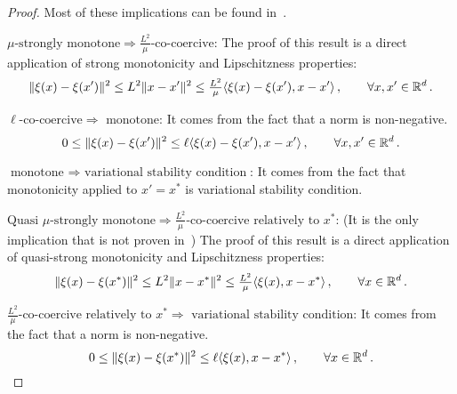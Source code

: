 \documentclass{article}
\begin{document}
\begin{proof}
Most of these implications can be found in~\citet{facchinei2007finite}.

$\mu\text{-strongly monotone}  \Longrightarrow  \frac{L^2}{\mu}\text{-co-coercive}$: 
The proof of this result is a direct application of strong monotonicity and Lipschitzness properties:
\begin{equation*}
  \|\xi(x)-\xi(x')\|^2 \leq L^2 \|x-x'\|^2 \leq \tfrac{L^2}{\mu} \langle \xi(x)-\xi(x'), x-x' \rangle \, , \qquad \forall x,x' \in \mathbb{R}^d\,.
\end{equation*}

$\ell\text{-co-coercive} \Longrightarrow \text{ monotone}$: It comes from the fact that a norm is non-negative. 
\begin{equation*}
  0 \leq \|\xi(x)-\xi(x')\|^2  \leq \ell \langle \xi(x)-\xi(x'), x-x' \rangle \, , \qquad \forall x,x' \in \mathbb{R}^d\,.
\end{equation*}

$\text{monotone } \Longrightarrow \text{ variational stability condition}$: It comes from the fact that monotonicity applied to $x' = x^*$ is variational stability condition.

$\text{Quasi }\mu\text{-strongly monotone}  \Longrightarrow  \frac{L^2}{\mu}\text{-co-coercive relatively to } x^*$: (It is the only implication that is not proven in~\citet{facchinei2007finite}) The proof of this result is a direct application of quasi-strong monotonicity and Lipschitzness properties:
\begin{equation*}
  \|\xi(x)-\xi(x^*)\|^2 \leq L^2 \|x-x^*\|^2 \leq \tfrac{L^2}{\mu} \langle \xi(x), x-x^* \rangle \, , \qquad \forall x \in \mathbb{R}^d\,.
\end{equation*}

$\frac{L^2}{\mu}\text{-co-coercive relatively to } x^* \Longrightarrow \text{ variational stability condition}$: It comes from the fact that a norm is non-negative. 
\begin{equation*}
  0 \leq \|\xi(x)-\xi(x^*)\|^2  \leq \ell \langle \xi(x), x-x^* \rangle \, , \qquad \forall x \in \mathbb{R}^d\,.
\end{equation*}


\end{proof}
\end{document}

